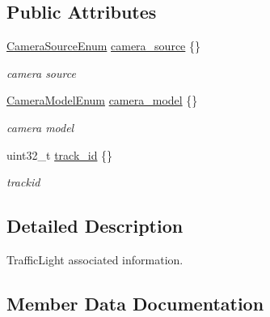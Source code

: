 \subsection*{Public Attributes}
\begin{DoxyCompactItemize}
\item 
\hyperlink{structmaf__perception__interface_1_1CameraSourceEnum}{Camera\+Source\+Enum} \hyperlink{structmaf__perception__interface_1_1TrafficLightAssociatedInfo_a656e1e916ef1207c34a88d09e4092b67}{camera\+\_\+source} \{\}
\begin{DoxyCompactList}\small\item\em camera source \end{DoxyCompactList}\item 
\hyperlink{structmaf__perception__interface_1_1CameraModelEnum}{Camera\+Model\+Enum} \hyperlink{structmaf__perception__interface_1_1TrafficLightAssociatedInfo_ac2bdd72d91dec1985e880bacb07caea3}{camera\+\_\+model} \{\}
\begin{DoxyCompactList}\small\item\em camera model \end{DoxyCompactList}\item 
uint32\+\_\+t \hyperlink{structmaf__perception__interface_1_1TrafficLightAssociatedInfo_ae09d68b6f9dc5115442a843e4753ba66}{track\+\_\+id} \{\}
\begin{DoxyCompactList}\small\item\em trackid \end{DoxyCompactList}\end{DoxyCompactItemize}


\subsection{Detailed Description}
Traffic\+Light associated information. 

\subsection{Member Data Documentation}
\mbox{\label{structmaf__perception__interface_1_1TrafficLightAssociatedInfo_ac2bdd72d91dec1985e880bacb07caea3}} 
